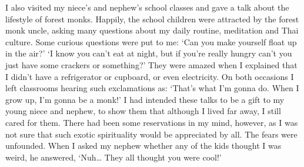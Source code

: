 I also visited my niece's and nephew's school classes and gave a talk
about the lifestyle of forest monks. Happily, the school children were
attracted by the forest monk uncle, asking many questions about my daily
routine, meditation and Thai culture. Some curious questions were put to
me: `Can you make yourself float up in the air?' `I know you can't eat
at night, but if you're really hungry can't you just have some crackers
or something?' They were amazed when I explained that I didn't have a
refrigerator or cupboard, or even electricity. On both occasions I left
classrooms hearing such exclamations as: `That's what I'm gonna do. When
I grow up, I'm gonna be a monk!' I had intended these talks to be a gift
to my young niece and nephew, to show them that although I lived far
away, I still cared for them. There had been some reservations in my
mind, however, as I was not sure that such exotic spirituality would be
appreciated by all. The fears were unfounded. When I asked my nephew
whether any of the kids thought I was weird, he answered, `Nuh\ldots{}
They all thought you were cool!'

